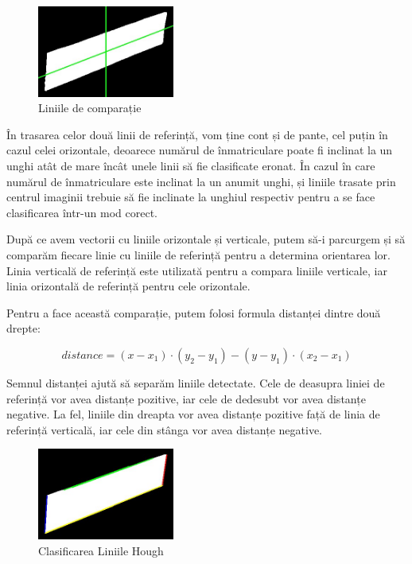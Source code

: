 \documentclass[a4paper,12pt]{report}
\begin{document}
\begin{figure}[h]
    \centering
    \includegraphics[width=0.4\textwidth]{images/reference_lines.jpg}
    \caption{Liniile de comparație}
\end{figure}
\FloatBarrier

În trasarea celor două linii de referință, vom ține cont și de pante, cel puțin în cazul celei orizontale, deoarece numărul de înmatriculare poate fi inclinat la un unghi atât de mare încât unele linii să fie clasificate eronat. În cazul în care numărul de înmatriculare este inclinat la un anumit unghi, și liniile trasate prin centrul imaginii trebuie să fie inclinate la unghiul respectiv pentru a se face clasificarea într-un mod corect.

După ce avem vectorii cu liniile orizontale și verticale, putem să-i parcurgem și să comparăm fiecare linie cu liniile de referință pentru a determina orientarea lor. Linia verticală de referință este utilizată pentru a compara liniile verticale, iar linia orizontală de referință pentru cele orizontale.

Pentru a face această comparație, putem folosi formula distanței dintre două drepte:

\[
    distance = (x - x_1) \cdot (y_2 - y_1) - (y - y_1) \cdot (x_2 - x_1)
\]

Semnul distanței ajută să separăm liniile detectate. Cele de deasupra liniei de referință vor avea distanțe pozitive, iar cele de dedesubt vor avea distanțe negative. La fel, liniile din dreapta vor avea distanțe pozitive față de linia de referință verticală, iar cele din stânga vor avea distanțe negative.

\begin{figure}[h]
    \centering
    \includegraphics[width=0.4\textwidth]{images/multiple_lines.jpg}
    \caption{Clasificarea Liniile Hough}
\end{figure}
\FloatBarrier
\end{document}
